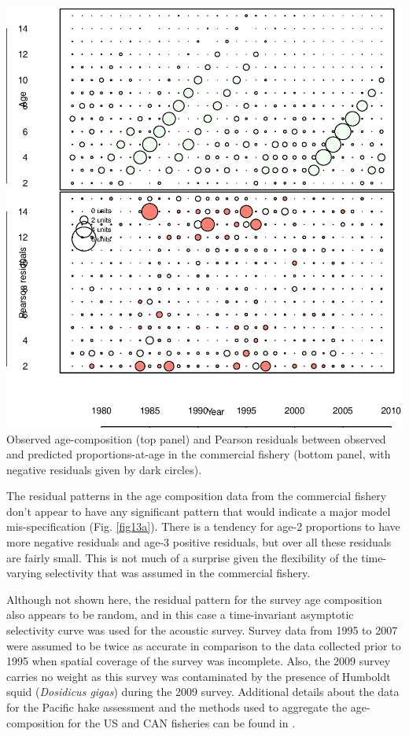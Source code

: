 \begin{multicols}{2}
\begin{figurehere}
	\centering
	\includegraphics[width=0.9\columnwidth]{iscamFigs/phakefig13a.eps}\\
	\caption{Observed age-composition (top panel) and Pearson residuals between observed and predicted proportions-at-age in the commercial fishery (bottom panel, with negative residuals given by dark circles).}\label{fig13a}
\end{figurehere}

The residual patterns in the age composition data from the commercial fishery don't appear to have any significant pattern that would indicate a major model mis-specification (Fig. \ref{fig13a}).  There is a tendency for age-2 proportions to have more negative residuals and age-3 positive residuals, but over all these residuals are fairly small.  This is not much of a surprise given the flexibility of the time-varying selectivity that was assumed in the commercial fishery.


Although not shown here, the residual pattern for the survey age composition also appears to be random, and in this case a time-invariant asymptotic selectivity curve was used for the acoustic survey. Survey data from 1995 to 2007 were assumed to be twice as accurate in comparison to the data collected prior to 1995 when spatial coverage of the survey was incomplete.  Also, the 2009 survey carries no weight as this survey was contaminated by the presence of Humboldt squid (\textit{Dosidicus gigas}) during the 2009 survey.  Additional details about the data for the Pacific hake assessment and the methods used to aggregate the age-composition for the US and CAN fisheries can be found in \cite{Martell2009}.


\end{multicols}
